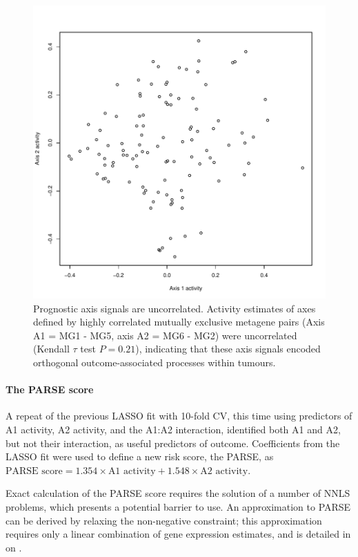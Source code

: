 \documentclass[dissertation.tex]{subfiles}
\begin{document}
\begin{figure}
\centering
\includegraphics[width=.7\linewidth]{analysis/biosurv/reports/18_SIS_diag_dsd_final/figure/metagene-pairs-10}
\caption[Prognostic axes are uncorrelated]{Prognostic axis signals are uncorrelated.  Activity estimates of axes defined by highly correlated mutually exclusive metagene pairs (Axis A1 = MG1 - MG5, axis A2 = MG6 - MG2) were uncorrelated (Kendall $\tau$ test $P = 0.21$), indicating that these axis signals encoded orthogonal outcome-associated processes within tumours.}\label{fig:sigs-axis-pairs}
\end{figure}

\paragraph{The \acrshort{PARSE} score}
A repeat of the previous \gls{LASSO} fit with 10-fold \gls{CV}, this time using predictors of A1 activity, A2 activity, and the A1:A2 interaction, identified both A1 and A2, but not their interaction, as useful predictors of outcome.  Coefficients from the \gls{LASSO} fit were used to define a new risk score, the \gls{PARSE}, as $\text{PARSE score} = 1.354 \times \text{A1 activity} + 1.548 \times \text{A2 activity}$.

Exact calculation of the \gls{PARSE} score requires the solution of a number of \gls{NNLS} problems, which presents a potential barrier to use.  An approximation to \gls{PARSE} can be derived by relaxing the non-negative constraint; this approximation requires only a linear combination of gene expression estimates, and is detailed in  on .
\end{document}
